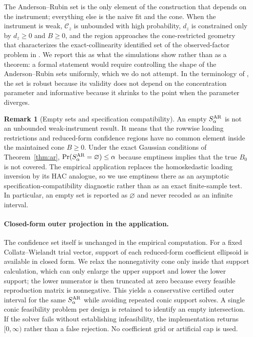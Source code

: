 \documentclass[12pt]{article}
\theoremstyle{plain}\newtheorem{theorem}{Theorem}[section]\newtheorem{proposition}[theorem]{Proposition}\newtheorem{lemma}[theorem]{Lemma}\newtheorem{corollary}[theorem]{Corollary}
\theoremstyle{definition}\newtheorem{definition}[theorem]{Definition}\newtheorem{assumption}[theorem]{Assumption}\newtheorem{remark}[theorem]{Remark}
\begin{document}
The Anderson--Rubin set is the only element of the construction that depends on the instrument; everything else is the naive fit and the cone. When the instrument is weak, $\mathcal C_z$ is unbounded with high probability, $d_z$ is constrained only by $d_z\ge0$ and $B\ge0$, and the region approaches the cone-restricted geometry that characterizes the exact-collinearity identified set of the observed-factor problem in \citet{companion2026}. We report this as what the simulations show rather than as a theorem: a formal statement would require controlling the shape of the Anderson--Rubin sets uniformly, which we do not attempt. In the terminology of \citet{andrews2019}, the set is robust because its validity does not depend on the concentration parameter and informative because it shrinks to the point when the parameter diverges.


\begin{remark}[Empty sets and specification compatibility]\label{rem:empty}
An empty $S^{\rm AR}_\alpha$ is not an unbounded weak-instrument result. It means that the rowwise loading restrictions and reduced-form confidence regions have no common element inside the maintained cone $B\ge0$. Under the exact Gaussian conditions of Theorem~\ref{thm:ar}, $\Pr(S^{\rm AR}_\alpha=\varnothing)\le\alpha$ because emptiness implies that the true $B_0$ is not covered. The empirical application replaces the homoskedastic loading inversion by its HAC analogue, so we use emptiness there as an asymptotic specification-compatibility diagnostic rather than as an exact finite-sample test. In particular, an empty set is reported as $\varnothing$ and never recoded as an infinite interval.
\end{remark}

\paragraph{Closed-form outer projection in the application.}
The confidence set itself is unchanged in the empirical computation. For a fixed Collatz--Wielandt trial vector, support of each reduced-form coefficient ellipsoid is available in closed form. We relax the nonnegativity cone only inside that support calculation, which can only enlarge the upper support and lower the lower support; the lower numerator is then truncated at zero because every feasible reproduction matrix is nonnegative. This yields a conservative certified outer interval for the same $S^{\rm AR}_\alpha$ while avoiding repeated conic support solves. A single conic feasibility problem per design is retained to identify an empty intersection. If the solver fails without establishing infeasibility, the implementation returns $[0,\infty)$ rather than a false rejection. No coefficient grid or artificial cap is used.
\end{document}
